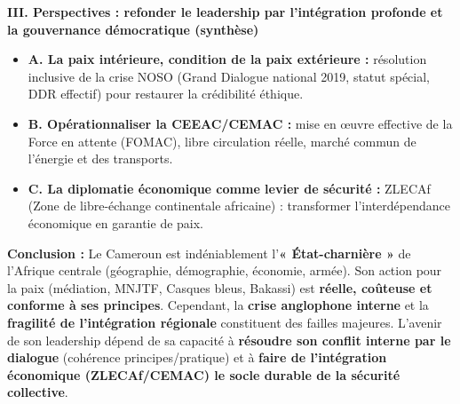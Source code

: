 \documentclass[11pt]{article}
\begin{document}
\begin{exoresolu}
\textbf{III. Perspectives : refonder le leadership par l'intégration profonde et la gouvernance démocratique (synthèse)}
\begin{itemize}
    \item \textbf{A. La paix intérieure, condition de la paix extérieure :} résolution inclusive de la crise NOSO (Grand Dialogue national 2019, statut spécial, DDR effectif) pour restaurer la crédibilité éthique.
    \item \textbf{B. Opérationnaliser la CEEAC/CEMAC :} mise en œuvre effective de la Force en attente (FOMAC), libre circulation réelle, marché commun de l'énergie et des transports.
    \item \textbf{C. La diplomatie économique comme levier de sécurité :} ZLECAf (Zone de libre-échange continentale africaine) : transformer l'interdépendance économique en garantie de paix.
\end{itemize}

\textbf{Conclusion :}
Le Cameroun est indéniablement l'\textbf{« État-charnière »} de l'Afrique centrale (géographie, démographie, économie, armée). Son action pour la paix (médiation, MNJTF, Casques bleus, Bakassi) est \textbf{réelle, coûteuse et conforme à ses principes}. Cependant, la \textbf{crise anglophone interne} et la \textbf{fragilité de l'intégration régionale} constituent des failles majeures. L'avenir de son leadership dépend de sa capacité à \textbf{résoudre son conflit interne par le dialogue} (cohérence principes/pratique) et à \textbf{faire de l'intégration économique (ZLECAf/CEMAC) le socle durable de la sécurité collective}.
\end{exoresolu}
\end{document}
